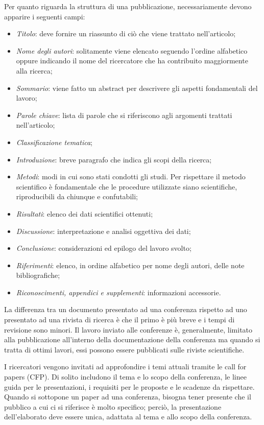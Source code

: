 Per quanto riguarda la struttura di una pubblicazione, necessariamente devono apparire i seguenti campi:
\begin{itemize}
    \item \textit{Titolo}: deve fornire un riassunto di ciò che viene trattato nell'articolo;
    \item \textit{Nome degli autori}: solitamente viene elencato seguendo l'ordine alfabetico oppure indicando il nome del ricercatore
    che ha contribuito maggiormente alla ricerca;
    \item \textit{Sommario}: viene fatto un abstract per descrivere gli aspetti fondamentali del lavoro;
    \item \textit{Parole chiave}: lista di parole che si riferiscono agli argomenti trattati nell'articolo;
    \item \textit{Classificazione tematica};
    \item \textit{Introduzione}: breve paragrafo che indica gli scopi della ricerca;
    \item \textit{Metodi}: modi in cui sono stati condotti gli studi. Per rispettare il metodo scientifico è fondamentale che
    le procedure utilizzate siano scientifiche, riproducibili da chiunque e confutabili;
    \item \textit{Risultati}: elenco dei dati scientifici ottenuti;
    \item \textit{Discussione}: interpretazione e analisi oggettiva dei dati;
    \item \textit{Conclusione}: considerazioni ed epilogo del lavoro svolto;
    \item \textit{Riferimenti}: elenco, in ordine alfabetico per nome degli autori, delle note bibliografiche;
    \item \textit{Riconoscimenti, appendici e supplementi}: informazioni accessorie.
\end{itemize}

La differenza tra un documento presentato ad una conferenza rispetto ad uno presentato ad una rivista di ricerca è che il primo è più breve e 
i tempi di revisione sono minori. Il lavoro inviato alle conferenze è, generalmente, limitato alla pubblicazione all’interno della documentazione 
della conferenza ma quando si tratta di ottimi lavori, essi possono essere pubblicati sulle riviste scientifiche.

I ricercatori vengono invitati ad approfondire i temi attuali tramite le call for papers (CFP). Di solito includono il tema e lo scopo della conferenza, 
le linee guida per le presentazioni, i requisiti per le proposte e le scadenze da rispettare. Quando si sottopone un paper ad una conferenza, bisogna 
tener presente che il pubblico a cui ci si riferisce è molto specifico; perciò, la presentazione dell’elaborato deve essere unica, adattata al tema e 
allo scopo della conferenza. 

